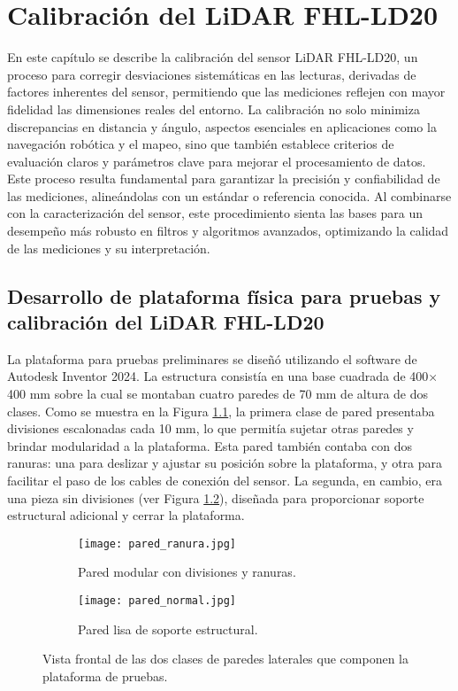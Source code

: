 \chapter{Calibración del LiDAR FHL-LD20}
En este capítulo se describe la calibración del sensor LiDAR FHL-LD20, un proceso para corregir desviaciones sistemáticas en las lecturas, derivadas de factores inherentes del sensor, permitiendo que las mediciones reflejen con mayor fidelidad las dimensiones reales del entorno.  La calibración no solo minimiza discrepancias en distancia y ángulo, aspectos esenciales en aplicaciones como la navegación robótica y el mapeo, sino que también establece criterios de evaluación claros y parámetros clave para mejorar el procesamiento de datos. Este proceso resulta fundamental para garantizar la precisión y confiabilidad de las mediciones, alineándolas con un estándar o referencia conocida. Al combinarse con la caracterización del sensor, este procedimiento sienta las bases para un desempeño más robusto en filtros y algoritmos avanzados, optimizando la calidad de las mediciones y su interpretación.

\section{Desarrollo de plataforma física para pruebas y calibración del LiDAR FHL-LD20}
La plataforma para pruebas preliminares se diseñó utilizando el software de Autodesk Inventor 2024. La estructura consistía en una base cuadrada de 400$\times$400 mm sobre la cual se montaban cuatro paredes de 70 mm de altura de dos clases. Como se muestra en la Figura \ref{fig:pared_ranura}, la primera clase de pared presentaba divisiones escalonadas cada 10 mm, lo que permitía sujetar otras paredes y brindar modularidad a la plataforma. Esta pared también contaba con dos ranuras: una para deslizar y ajustar su posición sobre la plataforma, y otra para facilitar el paso de los cables de conexión del sensor. La segunda, en cambio, era una pieza sin divisiones (ver Figura \ref{fig:pared_normal}), diseñada para proporcionar soporte estructural adicional y cerrar la plataforma.

\begin{figure}[H]
	\centering
	\begin{subfigure}{0.5\textwidth}
		\centering	
		\texttt{[image: pared\_ranura.jpg]}
		\caption{Pared modular con divisiones y ranuras.}
		\label{fig:pared_ranura}
	\end{subfigure}%
	\begin{subfigure}{0.5\textwidth}
		\centering
		\texttt{[image: pared\_normal.jpg]}
		\caption{Pared lisa de soporte estructural.}
		\label{fig:pared_normal}
	\end{subfigure}
	
	\caption{Vista frontal de las dos clases de paredes laterales que componen la plataforma de pruebas.}
	\label{fig:pared}
\end{figure}

